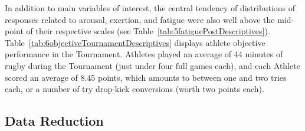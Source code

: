 \begin{CJK}{UTF8}{gbsn}



In addition to main variables of interest, the central tendency of distributions of responses related to arousal, exertion, and fatigue were also well above the mid-point of their respective scales (see Table~\ref{tab:5fatiguePostDescriptives}).  Table~\ref{tab:6objectiveTournamentDescriptives} displays athlete objective performance in the Tournament. Athletes played an average of 44 minutes of rugby during the Tournament (just under four full games each), and each Athlete scored an average of 8.45 points, which amounts to between one and two tries each, or a number of try drop-kick conversions (worth two points each).



\subsection{Data Reduction}







\end{CJK}
